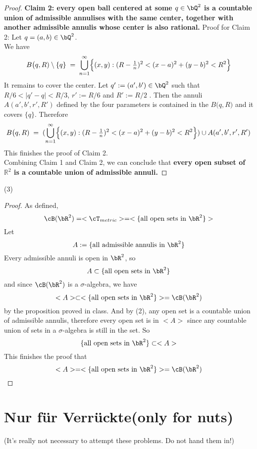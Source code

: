 \documentclass[lang=cn,11pt]{elegantbook}
\begin{document}
\begin{proof}
\textbf{Claim 2: every open ball centered at some $q\in \bQ^2$ is a countable union of admissible annulises with the same center, together with another admissible annulis whose center is also rational.}
Proof for Claim 2: 
\noindent Let $q = (a,b) \in \bQ^2$.\\
We have
\[    
   B\bigl(q, R)  \setminus \{q\}
   \;=\; 
   \bigcup_{n=1}^{\infty} \Bigl\{(x,y) : (R-\tfrac{1}{n})^2 < (x-a)^2 + (y-b)^2 < R^2\Bigr\}
\]
It remains to cover the center. Let $q' := (a',b') \in \bQ^2$ such that $R/6 < |q' - q| < R/3$, $r' := R/6$ and $R' := R/2$ . Then the annuli $A(a',b',r',R')$ defined by the four parameters is contained in the $ B\bigl(q, R)$ and it covers $\{q\}$. 
Therefore
\[    
   B\bigl(q, R)
   \;=\; 
 (  \bigcup_{n=1}^{\infty} \Bigl\{(x,y) : (R-\tfrac{1}{n})^2 < (x-a)^2 + (y-b)^2 < R^2\Bigr\}) \cup A(a',b',r',R')
\]
This finishes the proof of Claim 2.\\
Combining Claim 1 and Claim 2, we can conclude that \textbf{every open subset of $\mathbb{R}^2$ is a countable union of admissible annuli.}\end{proof}

\noindent (3) 
\begin{proof}

As defined,
\[
\cB(\bR^2) = <\cT_{metric}> = <\{\text{all open sets in }\bR^2\}>
\]
 Let 
\[ A:=   \{     \text{all admissible annulis in $\bR^2$}   \}\]
Every admissible annuli is open in $\bR^2$, so 
\[
A \subset \{\text{all open sets in }\bR^2\}
\]
and since $\cB(\bR^2)$ is a $\sigma$-algebra, we have 
\[
<A> \subset <\{\text{all open sets in }\bR^2\}> =\cB(\bR^2)
\]by the proposition proved in class.
\noindent And by (2), any open set is a countable union of admissible annulis, therefore every open set is in $<A>$ since any countable union of sets in a $\sigma$-algebra is still in the set. So
\[   
 \{\text{all open sets in } \bR^2\} \subset <A>
\]
This finishes the proof that 
\[
<A> = <\{\text{all open sets in }\bR^2\}> =\cB(\bR^2)
\]
\end{proof}





\section{Nur für Verrückte(only for nuts)}
(It’s really not necessary to attempt these problems. Do not hand them in!)
\end{document}
